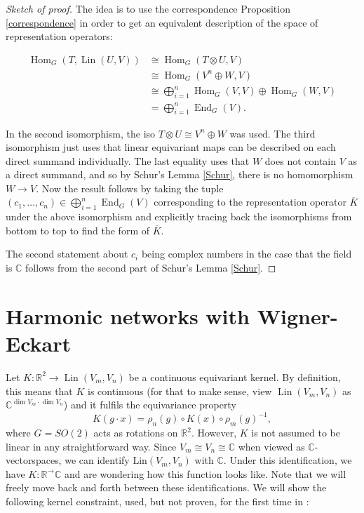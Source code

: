 \documentclass[12pt, a4paper]{article}
\theoremstyle{plain}
\theoremstyle{definition}
\theoremstyle{remark}
\newcommand{\R}{\mathds{R}}
\newcommand{\C}{\mathds{C}}
\DeclareMathOperator{\lin}{Lin}
\DeclareMathOperator{\Dim}{dim}
\DeclareMathOperator{\End}{End}
\DeclareMathOperator{\Hom}{Hom}
\begin{document}
\begin{proof}[Sketch of proof]
The idea is to use the correspondence Proposition \ref{correspondence} in order to get an equivalent description of the space of representation operators:

\begin{align*}
\Hom_G(T, \lin(U, V)) & \cong \Hom_G(T \otimes U, V) \\
& \cong \Hom_G(V^n \oplus W, V) \\
& \cong \bigoplus_{i = 1}^{n} \Hom_G(V, V) \oplus \Hom_G(W, V) \\
& = \bigoplus_{i = 1}^{n} \End_G(V).
\end{align*}

In the second isomorphism, the iso $T \otimes U \cong V^n \oplus W$ was used. The third isomorphism just uses that linear equivariant maps can be described on each direct summand individually. The last equality uses that $W$ does not contain $V$ as a direct summand, and so by Schur's Lemma \ref{Schur}, there is no homomorphism $W \to V$. Now the result follows by taking the tuple $(c_1, \dots, c_n) \in \bigoplus_{i = 1}^{n} \End_G(V)$ corresponding to the representation operator $\overline{K}$ under the above isomorphism and explicitly tracing back the isomorphisms from bottom to top to find the form of $\overline{K}$.

The second statement about $c_i$ being complex numbers in the case that the field is $\C$ follows from the second part of Schur's Lemma \ref{Schur}.
\end{proof}

\section{Harmonic networks with Wigner-Eckart}

Let $K: \R^2 \to \lin(V_m, V_n)$ be a continuous equivariant kernel. By definition, this means that $K$ is continuous (for that to make sense, view $\lin (V_m, V_n)$ as $\C^{\Dim V_m \cdot \Dim V_n}$) and it fulfils the equivariance property
\begin{equation}\label{kernel-definition}
K(g\cdot x) = \rho_n(g) \circ K(x) \circ \rho_m(g)^{-1},
\end{equation}
where $G = SO(2)$ acts as rotations on $\R^2$. However, $K$ is not assumed to be linear in any straightforward way. Since $V_m \cong V_n \cong \C$ when viewed as $\C$-vectorspaces, we can identify $\text{Lin}(V_m, V_n)$ with $\C$. Under this identification, we have $K: \R^ \to \C$ and are wondering how this function looks like. Note that we will freely move back and forth between these identifications. We will show the following kernel constraint, used, but not proven, for the first time in \cite{hnets}:
\end{document}
